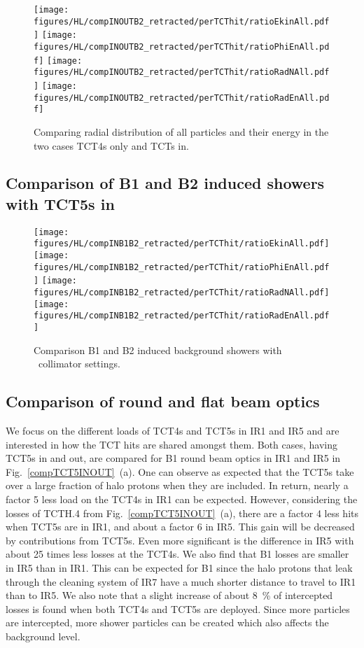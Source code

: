 \begin{figure}
\centering
\texttt{[image: figures/HL/compINOUTB2\_retracted/perTCThit/ratioEkinAll.pdf]}
\texttt{[image: figures/HL/compINOUTB2\_retracted/perTCThit/ratioPhiEnAll.pdf]}
\texttt{[image: figures/HL/compINOUTB2\_retracted/perTCThit/ratioRadNAll.pdf]}
\texttt{[image: figures/HL/compINOUTB2\_retracted/perTCThit/ratioRadEnAll.pdf]}
 \caption{Comparing radial distribution of all particles and their energy in the two cases TCT4s only and TCTs in.
  \label{compINOUTB2}}
\end{figure}

\subsection{Comparison of B1 and B2 induced showers with TCT5s in}


\begin{figure}
\begin{center}
\texttt{[image: figures/HL/compINB1B2\_retracted/perTCThit/ratioEkinAll.pdf]}
\texttt{[image: figures/HL/compINB1B2\_retracted/perTCThit/ratioPhiEnAll.pdf]}
\texttt{[image: figures/HL/compINB1B2\_retracted/perTCThit/ratioRadNAll.pdf]}
\texttt{[image: figures/HL/compINB1B2\_retracted/perTCThit/ratioRadEnAll.pdf]}
\end{center}
\vspace{-0.6cm}
 \caption{Comparison B1 and B2 induced background showers with \twosigmaret~collimator settings.
  \label{compINB1B2}}
\end{figure}

\subsection{Comparison of round and flat beam optics}
We focus on the different loads of TCT4s and TCT5s in IR1 and IR5 and are interested in how the TCT hits are shared amongst them. Both cases, having TCT5s in and out, are compared for B1 round beam optics in IR1 and IR5 in Fig.~\ref{compTCT5INOUT}~(a). One can observe as expected that the TCT5s take over a large fraction of halo protons when they are included. In return, nearly a factor 5 less load on the TCT4s in IR1 can be expected. However, considering the losses of TCTH.4 from Fig.~\ref{compTCT5INOUT}~(a), there are a factor 4 less hits when TCT5s are in IR1, and about a factor 6 in IR5. This gain will be decreased by contributions from TCT5s. Even more significant is the difference in IR5 with about 25 times less losses at the TCT4s. We also find that B1 losses are smaller in IR5 than in IR1. This can be expected for B1 since the halo protons that leak through the cleaning system of IR7 have a much shorter distance to travel to IR1 than to IR5. We also note that a slight increase of about 8~\% of intercepted losses is found when both TCT4s and TCT5s are deployed. Since more particles are intercepted, more shower particles can be created which also affects the background level. %


